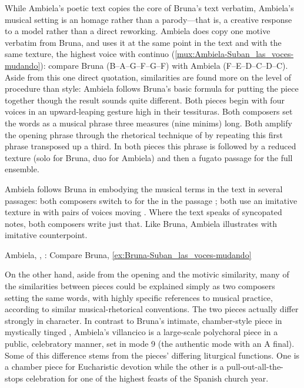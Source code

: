 While Ambiela's poetic text copies the core of Bruna's text verbatim, Ambiela's
musical setting is an homage rather than a parody---that is, a creative
response to a model rather than a direct reworking.
Ambiela does copy one motive verbatim from Bruna, and uses it at the same point
in the text and with the same texture, the highest voice with continuo
(\cref{mux:Ambiela-Suban_las_voces-mudando}): compare Bruna 
(B\fl--A--G--F\sh--G--F\sh) with Ambiela  (F--E--D--C\sh--D--C\sh).
Aside from this one direct quotation, similarities are found more on the level
of procedure than style: Ambiela follows Bruna's basic formula for putting the
piece together though the result sounds quite different.
Both pieces begin with four voices in an upward-leaping gesture high in their
tessituras.  
Both composers set the words  as a musical
phrase three measures (nine minims) long.
Both amplify the opening phrase through the rhetorical technique of
 by repeating this first phrase transposed up a third. 
In both pieces this phrase is followed by a reduced texture (solo for Bruna,
duo for Ambiela) and then a fugato passage for the full ensemble.

Ambiela follows Bruna in embodying the musical terms in the text in several
passages: both composers switch to \meterC{} for the  in the
passage ; both use an imitative texture in
 with pairs of voices moving .
Where the text speaks of syncopated notes, both composers write just that.
Like Bruna, Ambiela illustrates  with imitative counterpoint.

{Ambiela, , : Compare Bruna,
\cref{ex:Bruna-Suban_las_voces-mudando}}

On the other hand, aside from the opening and the motivic similarity, many of
the similarities between pieces could be explained simply as two composers
setting the same words, with highly specific references to musical practice,
according to similar musical-rhetorical conventions.
The two pieces actually differ strongly in character.
In contrast to Bruna's intimate, chamber-style piece in mystically tinged
, Ambiela's villancico is a large-scale polychoral piece in
a public, celebratory manner, set in mode 9 (the authentic mode with an A
final).
Some of this difference stems from the pieces' differing liturgical functions. 
One is a chamber piece for Eucharistic devotion while the other is a
pull-out-all-the-stops celebration for one of the highest feasts of the Spanish
church year.

